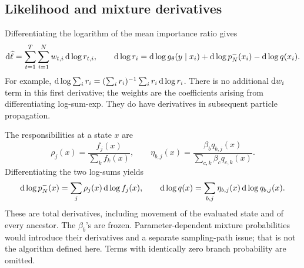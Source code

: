 \subsection{Likelihood and mixture derivatives}

Differentiating the logarithm of the mean importance ratio gives
\begin{equation}
\label{eq:bf-covariance-proposal-total-score}
 \mathrm d\widehat\ell
 =\sum_{t=1}^T\sum_{i=1}^Nw_{t,i}\,\mathrm d\log r_{t,i},
 \qquad
 \mathrm d\log r_i=\mathrm d\log g_\theta(y\mid x_i)
             +\mathrm d\log p_N^-(x_i)-\mathrm d\log q(x_i).
\end{equation}
For example,
\(\mathrm d\log\sum_i r_i=(\sum_i r_i)^{-1}\sum_i r_i\,\mathrm d\log r_i\).
There is no additional \(\mathrm d w_i\) term in this first derivative;
the weights are the coefficients arising from differentiating log-sum-exp.
They do have derivatives in subsequent particle propagation.

The responsibilities at a state \(x\) are
\begin{equation}
\label{eq:bf-covariance-proposal-responsibilities}
 \rho_j(x)=\frac{f_j(x)}{\sum_k f_k(x)},\qquad
 \eta_{b,j}(x)=
 \frac{\beta_bq_{b,j}(x)}
      {\sum_{c,k}\beta_cq_{c,k}(x)}.
\end{equation}
Differentiating the two log-sums yields
\begin{equation}
\label{eq:bf-covariance-proposal-mixture-differentials}
 \mathrm d\log p_N^-(x)=\sum_j\rho_j(x)\,\mathrm d\log f_j(x),\qquad
 \mathrm d\log q(x)=\sum_{b,j}\eta_{b,j}(x)\,\mathrm d\log q_{b,j}(x).
\end{equation}
These are total derivatives, including movement of the evaluated state
and of every ancestor. The \(\beta_b\)'s are frozen. Parameter-dependent
mixture probabilities would introduce their derivatives and a separate
sampling-path issue; that is not the algorithm defined here. Terms with
identically zero branch probability are omitted.

